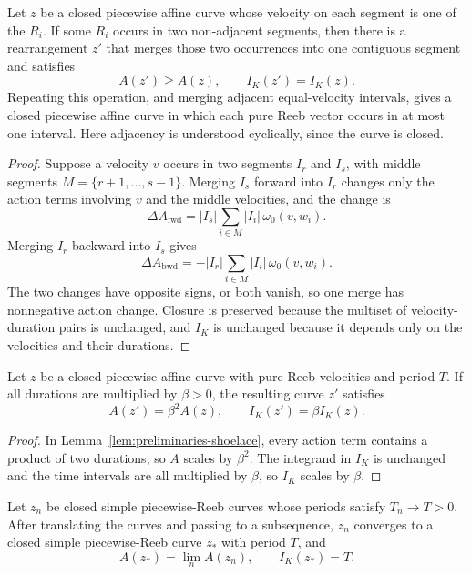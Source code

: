 \begin{lemma}\label{lem:generalized-reeb-merging}
Let \(z\) be a closed piecewise affine curve whose velocity on each segment is
one of the \(R_i\). If some \(R_i\) occurs in two non-adjacent segments, then
there is a rearrangement \(z'\) that merges those two occurrences into one
contiguous segment and satisfies
\[
  A(z')\geq A(z),
  \qquad
  I_K(z')=I_K(z).
\]
Repeating this operation, and merging adjacent equal-velocity intervals,
gives a closed piecewise affine curve in which each pure Reeb vector occurs in
at most one interval. Here adjacency is understood cyclically, since the curve
is closed.
\end{lemma}

\begin{proof}
Suppose a velocity \(v\) occurs in two segments \(I_r\) and \(I_s\), with
middle segments \(M=\{r+1,\ldots,s-1\}\). Merging \(I_s\) forward into \(I_r\)
changes only the action terms involving \(v\) and the middle velocities, and
the change is
\[
  \Delta A_{\mathrm{fwd}}
  =
  |I_s|\sum_{i\in M}|I_i|\,\omega_0(v,w_i).
\]
Merging \(I_r\) backward into \(I_s\) gives
\[
  \Delta A_{\mathrm{bwd}}
  =
  -|I_r|\sum_{i\in M}|I_i|\,\omega_0(v,w_i).
\]
The two changes have opposite signs, or both vanish, so one merge has
nonnegative action change. Closure is preserved because the multiset of
velocity-duration pairs is unchanged, and \(I_K\) is unchanged because it
depends only on the velocities and their durations.
\end{proof}

\begin{lemma}[Rescaling]\label{lem:generalized-reeb-rescaling}
Let \(z\) be a closed piecewise affine curve with pure Reeb velocities and
period \(T\). If all durations are multiplied by \(\beta>0\), the resulting
curve \(z'\) satisfies
\[
  A(z')=\beta^2A(z),
  \qquad
  I_K(z')=\beta I_K(z).
\]
\end{lemma}

\begin{proof}
In Lemma~\ref{lem:preliminaries-shoelace}, every action term contains a
product of two durations, so \(A\) scales by \(\beta^2\). The integrand in
\(I_K\) is unchanged and the time intervals are all multiplied by \(\beta\), so
\(I_K\) scales by \(\beta\).
\end{proof}

\begin{lemma}\label{lem:generalized-reeb-compactness}
Let \(z_n\) be closed simple piecewise-Reeb curves whose periods satisfy
\(T_n\to T>0\). After translating the curves and passing to a subsequence,
\(z_n\) converges to a closed simple piecewise-Reeb curve \(z_*\) with period
\(T\), and
\[
  A(z_*)=\lim_n A(z_n),
  \qquad
  I_K(z_*)=T.
\]
\end{lemma}

